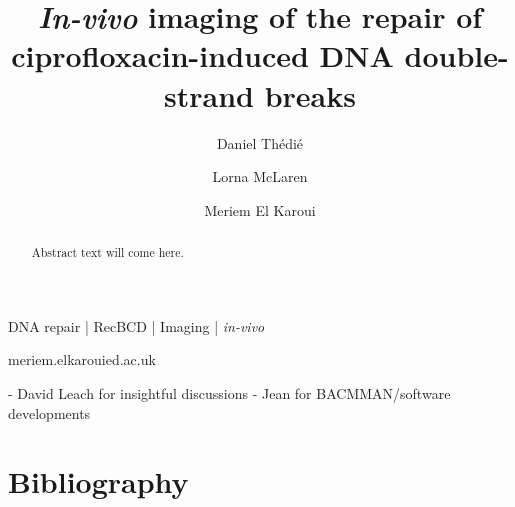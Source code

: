 \documentclass[times, twoside]{zHenriquesLab-StyleBioRxiv}
\begin{document}
\title{\emph{In-vivo} imaging of the repair of ciprofloxacin-induced DNA double-strand breaks}
\shorttitle{}

\author[1]{Daniel Thédié}
\author[1]{Lorna McLaren}
\author[1]{Meriem El Karoui}



\maketitle

\begin{abstract}
Abstract text will come here.
\end{abstract}

\begin{keywords}
DNA repair | RecBCD | Imaging | \emph{in-vivo}
\end{keywords}

\begin{corrauthor}
meriem.elkaroui\at ed.ac.uk
\end{corrauthor}













\begin{acknowledgements}
- David Leach for insightful discussions
- Jean for BACMMAN/software developments
\end{acknowledgements}

\section*{Bibliography}


\onecolumn
\newpage


\end{document}
